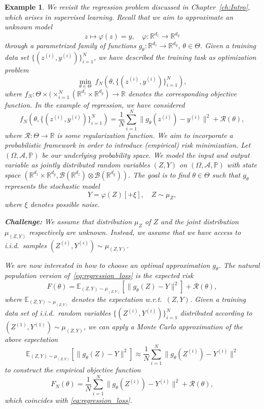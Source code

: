 \documentclass[12pt,openany]{book}
\newtheorem{example}[thm]{Example}
\theoremstyle{definition}
\theoremstyle{definition}
\newcommand{\E}{\mathbb{E}}
\newcommand{\R}{\mathbb{R}}
\newcommand{\PP}{\mathbb{P}}
\def\P{\mathbb{P}}
\begin{document}
\begin{example}
We revisit the regression problem discussed in Chapter~\ref{ch:Intro}, which arises in supervised learning. Recall that we aim to approximate an unknown model 
\[z\mapsto \varphi(z) = y,\quad \varphi:\R^{d_z}\to\R^{d_y} \]
through a parametrized family of functions $g_\theta:\R^{d_z}\to\R^{d_y}$, $\theta\in\Theta$. Given a training data set $\{(z^{(i)},y^{(i)})\}_{i=1}^N$, we have described the training task as optimization problem
\[\min_{\theta\in\Theta}\ f_N(\theta,\{(z^{(i)},y^{(i)})\}_{i=1}^N), \]
where $f_N:\Theta\times (\times_{i=1}^N (\R^{d_z}\times \R^{d_y})\to\R$ denotes the corresponding objective function. In the example of regression, we have considered 
\begin{equation}\label{eq:regression_loss}
f_N(\theta,\{(z^{(i)},y^{(i)})\}_{i=1}^N) = \frac{1}{N}\sum_{i=1}^N \|g_\theta(z^{(i)})-y^{(i)}\|^2 + \mathcal R(\theta),
\end{equation}
where $\mathcal R:\Theta\to\R$ is some regularization function. We aim to incorporate a probabilistic framework in order to introduce (empirical) risk minimization. Let $(\Omega,\mathcal A,\P)$ be our underlying probability space. We model the input and output variable as jointly distributed random variables $(Z,Y)$ on $(\Omega,\mathcal A,\PP)$ with state space $(\R^{d_z}\times \R^{d_y}, \mathcal B(\R^{d_z})\otimes\mathcal B(\R^{d_y}))$. The goal is to find $\theta\in\Theta$ such that $g_\theta$ represents the stochastic model
\[Y = \varphi(Z) [+ \xi],\quad Z\sim\mu_Z,\]
where $\xi$ denotes possible noise. 

\textbf{Challenge:} We assume that distribution $\mu_Z$ of $Z$ and the joint distribution $\mu_{(Z,Y)}$ respectively are unknown. Instead, we assume that we have access to i.i.d.~samples $(Z^{(i)},Y^{(i)})\sim\mu_{(Z,Y)}$.\medskip

We are now interested in how to choose an optimal approximation $g_\theta$. The natural population version of~\eqref{eq:regression_loss} is the expected risk 
\[F(\theta) = \E_{(Z,Y)\sim\mu_{(Z,Y)}}[\|g_\theta(Z)-Y\|^2] + \mathcal R(\theta), \]
where $\E_{(Z,Y)\sim\mu_{(Z,Y)}}$ denotes the expectation w.r.t.~$(Z,Y)$. Given a training data set of i.i.d.~random variables $\{(Z^{(i)},Y^{(i)})\}_{i=1}^N$ distributed according to $(Z^{(1)},Y^{(1)})\sim\mu_{(Z,Y)}$, we can apply a Monte Carlo approximation of the above expectation
\[ \E_{(Z,Y)\sim\mu_{(Z,Y)}}[\|g_\theta(Z)-Y\|^2] \approx \frac{1}{N}\sum_{i=1}^N \|g_\theta(Z^{(i)})-Y^{(i)}\|^2 \]
to construct the empirical objective function
\[F_N(\theta) = \frac{1}{N}\sum_{i=1}^N \|g_\theta(Z^{(i)})-Y^{(i)}\|^2+\mathcal R(\theta), \]
which coincides with \eqref{eq:regression_loss}.
\end{example}
\end{document}
